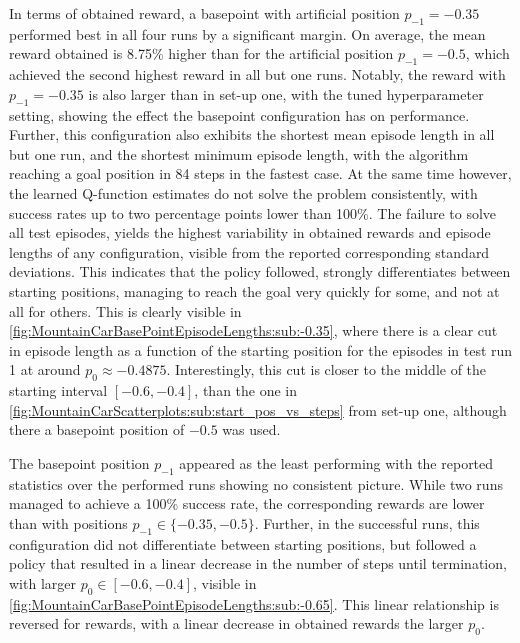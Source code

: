 \documentclass[
    a4paper,
    11pt,
    bibliography=totoc,
    listof=totoc,      
    headinclude=true,
    cleardoublepage=empty,
]{scrbook}
\theoremstyle{plain}
\theoremstyle{definition}
\theoremstyle{remark}
\begin{document}
In terms of obtained reward, a basepoint with artificial position $p_{-1}
=-0.35$ performed best in all four runs by a significant margin. On 
average, the mean reward obtained is 8.75\% higher than for the 
artificial position $p_{-1}=-0.5$, which achieved the second highest 
reward in all but one runs. Notably, the reward with $p_{-1}=-0.35$ is 
also larger than in set-up one, with the tuned hyperparameter setting, 
showing the effect the basepoint configuration has on performance. 
Further, this configuration also exhibits the shortest mean episode 
length in all but one run, and the shortest minimum episode length, with 
the algorithm reaching a goal position in 84 steps in the fastest case. 
At the same time however, the learned Q-function estimates do not solve 
the problem consistently, with success rates up to two percentage points 
lower than 100\%. The failure to solve all test episodes, yields the 
highest variability in obtained rewards and episode lengths of any
configuration, visible from the reported corresponding standard 
deviations. This indicates that the policy followed, strongly 
differentiates between starting positions, managing to reach the goal 
very quickly for some, and not at all for others. This is clearly visible 
in \cref{fig:MountainCarBasePointEpisodeLengths:sub:-0.35}, where there 
is a clear cut in episode length as a function of the starting position 
for the episodes in test run 1 at around $p_0\approx -0.4875$. 
Interestingly, this cut is closer to the middle of the starting interval 
$[-0.6, -0.4]$, than the one in 
\cref{fig:MountainCarScatterplots:sub:start_pos_vs_steps} from set-up one,
although there a basepoint position of $-0.5$ was used.

The basepoint position $p_{-1}$ appeared as the least performing with the
reported statistics over the performed runs showing no consistent 
picture. While two runs managed to achieve a 100\% success rate, the 
corresponding rewards are lower than with positions $p_{-1}\in\{-0.35, 
-0.5\}$. Further, in the successful runs, this configuration did not 
differentiate between starting positions, but followed a policy that 
resulted in a linear decrease in the number of steps until termination, 
with larger $p_0\in[-0.6, -0.4]$, visible in 
\cref{fig:MountainCarBasePointEpisodeLengths:sub:-0.65}. This linear 
relationship is reversed for rewards, with a linear decrease in obtained
rewards the larger $p_0$.
\end{document}
